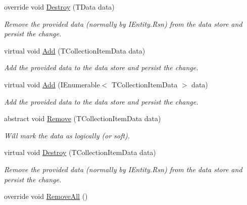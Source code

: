 \begin{DoxyCompactItemize}
override void \hyperlink{classCqrs_1_1Azure_1_1BlobStorage_1_1TableStorageStore_a1ad02e710a3fe1d794d99db332c351dc_a1ad02e710a3fe1d794d99db332c351dc}{Destroy} (T\+Data data)
\begin{DoxyCompactList}\small\item\em Remove the provided {\itshape data}  (normally by I\+Entity.\+Rsn) from the data store and persist the change. \end{DoxyCompactList}\item 
virtual void \hyperlink{classCqrs_1_1Azure_1_1BlobStorage_1_1TableStorageStore_ae48083bacf8a74175122e7618ae2a605_ae48083bacf8a74175122e7618ae2a605}{Add} (T\+Collection\+Item\+Data data)
\begin{DoxyCompactList}\small\item\em Add the provided {\itshape data}  to the data store and persist the change. \end{DoxyCompactList}\item 
virtual void \hyperlink{classCqrs_1_1Azure_1_1BlobStorage_1_1TableStorageStore_a79dc78a910107ede003b145a2da25897_a79dc78a910107ede003b145a2da25897}{Add} (I\+Enumerable$<$ T\+Collection\+Item\+Data $>$ data)
\begin{DoxyCompactList}\small\item\em Add the provided {\itshape data}  to the data store and persist the change. \end{DoxyCompactList}\item 
abstract void \hyperlink{classCqrs_1_1Azure_1_1BlobStorage_1_1TableStorageStore_a8e013351f5dcccd1915bf7ed6c58317e_a8e013351f5dcccd1915bf7ed6c58317e}{Remove} (T\+Collection\+Item\+Data data)
\begin{DoxyCompactList}\small\item\em Will mark the {\itshape data}  as logically (or soft). \end{DoxyCompactList}\item 
virtual void \hyperlink{classCqrs_1_1Azure_1_1BlobStorage_1_1TableStorageStore_a0b408504b9553b9c649b7186a382052a_a0b408504b9553b9c649b7186a382052a}{Destroy} (T\+Collection\+Item\+Data data)
\begin{DoxyCompactList}\small\item\em Remove the provided {\itshape data}  (normally by I\+Entity.\+Rsn) from the data store and persist the change. \end{DoxyCompactList}\item 
override void \hyperlink{classCqrs_1_1Azure_1_1BlobStorage_1_1TableStorageStore_aadd66b35bfa105ef4446bd791e99a3d5_aadd66b35bfa105ef4446bd791e99a3d5}{Remove\+All} ()

\end{DoxyCompactItemize}
